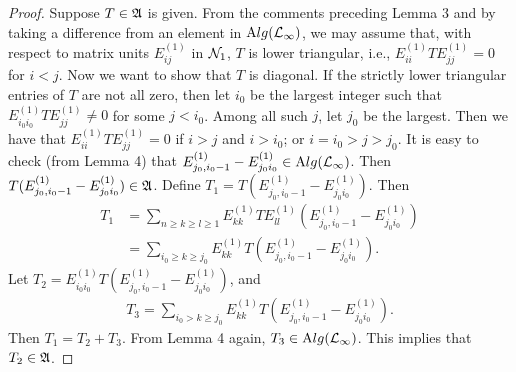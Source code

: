 \begin{proof}
Suppose $T\in\mathfrak A$ is given. From the
comments preceding Lemma 3 and by taking a difference from an
element in $\mathrm Alg(\mathcal L_\infty)$, we may assume that, with respect to
matrix units $E_{ij}^{(1)}$ in $\mathcal N_1$, $T$ is lower triangular,
i.e., $E_{ii}^{(1)}TE_{jj}^{(1)}=0$ for $i<j$. Now we want to show
that $T$ is diagonal. If the strictly lower triangular entries of
$T$ are not all zero, then let $i_0$ be the largest integer such
that $E_{i_0i_0}^{(1)}TE_{jj}^{(1)}\neq0$ for some $j<i_0$. Among
all such $j$, let $j_0$ be the largest. Then we have that
$E_{ii}^{(1)}TE_{jj}^{(1)}=0$ if $i>j$ and $i>i_0$; or
$i=i_0>j>j_0$. It is easy to check (from Lemma 4) that
$E_{j_0,i_0-1}^{(1)}-E_{j_0i_0}^{(1)}\in\mathrm Alg(\mathcal L_\infty)$. Then $
T(E_{j_0,i_0-1}^{(1)}-E_{j_0i_0}^{(1)})  \in\mathfrak A$. Define $T_1
=T(E_{j_0,i_0-1}^{(1)}-E_{j_0i_0}^{(1)})
 $. Then
\begin{align*}
T_1 &= \sum_{n\ge k \geq l\ge1} E_{kk}^{(1)}TE_{ll}^{(1)}( E_{j_0,
i_0 - 1}^{(1)} - E_{j_{0}i_{0}}^{(1)})\\
 &= \sum_{i_{0} \geq k \geq j_{0}}
E_{kk}^{(1)}T( E_{j_0, i_0 - 1}^{(1)} - E_{j_{0}i_{0}}^{(1)} ).
\end{align*}
Let $T_2= E_{i_0 i_0}^{(1)}T(E_{j_0, i_0 - 1}^{(1)} -
E_{j_{0}i_{0}}^{(1)})$, and 
\begin{align*}
T_{3} =\sum_{i_0 > k \geq j_{0}}
E_{kk}^{(1)}T(E_{j_0, i_0 - 1}^{(1)} - E_{j_{0}i_{0}}^{(1)}).
\end{align*}
Then $T_1=T_2+T_3$. From Lemma 4 again, $T_3\in\mathrm Alg(\mathcal L_\infty)$.
This implies that $T_2\in\mathfrak A$.


\end{proof}

